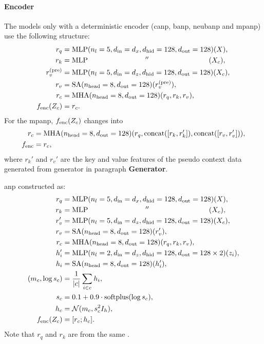 \paragraph{Encoder}
The models only with a deterministic encoder (\gls{canp}, \gls{banp}, \gls{neubanp} and \gls{mpanp}) use the following structure:
\begin{align*}
    r_q &= \text{MLP}(n_l=5, d_{\text{in}}=d_x, d_{\text{hid}}=128, d_{\text{out}}=128)(X), \\
    r_k &= \text{MLP} \qquad \qquad \qquad \qquad '' \qquad \qquad \qquad  \qquad \ (X_c), \\
    r_v^{(\text{pre})} &= \text{MLP}(n_l=5, d_{\text{in}}=d_z, d_{\text{hid}}=128, d_{\text{out}}=128)(X_c), \\
    r_v &= \text{SA}(n_{\text{head}}=8, d_{\text{out}}=128)(r_v^{(\text{pre})}), \\
    r_c &= \text{MHA}(n_{\text{head}}=8, d_{\text{out}}=128)(r_q, r_k, r_v), \\
    f_\text{enc}(Z_c) &= r_c.
\end{align*}
For the \gls{mpanp}, $f_{\text{enc}}(Z_c)$ changes into 
\begin{align*}
    r_c &= \text{MHA}(n_{\text{head}}=8, d_{\text{out}}=128)(r_q, \text{concat}([r_k,r_k']), \text{concat}([r_v,r_v'])),\\
    f_{\text{enc}} &= r_c,
\end{align*} where $r_k'$ and $r_v'$ are the key and value features of the pseudo context data generated from generator in paragraph \textbf{Generator}.

\gls{anp} constructed as:
\begin{align*}
    r_q &= \text{MLP}(n_l=5, d_{\text{in}}=d_x, d_{\text{hid}}=128, d_{\text{out}}=128)(X), \\
    r_k &= \text{MLP} \qquad \qquad \qquad \qquad '' \qquad \qquad \qquad  \qquad \ (X_c), \\
    r_v' &= \text{MLP}(n_l=5, d_{\text{in}}=d_z, d_{\text{hid}}=128, d_{\text{out}}=128)(X_c), \\
    r_v &= \text{SA}(n_{\text{head}}=8, d_{\text{out}}=128)(r_v'), \\
    r_c &= \text{MHA}(n_{\text{head}}=8, d_{\text{out}}=128)(r_q, r_k, r_v), \\
    h_i' &= \text{MLP}(n_l=2, d_{\text{in}}=d_z, d_{\text{hid}}=128, d_{\text{out}}=128 \times 2)(z_i), \\
    h_i &= \text{SA}(n_{\text{head}}=8, d_{\text{out}}=128)(h_i'), \\
    (m_c, \log s_c) &= \frac{1}{|c|} \sum_{i \in c} h_i, \\
    s_c &= 0.1 + 0.9 \cdot \text{softplus}(\log s_c), \\
    h_c &= {\mathcal{N}}(m_c, s^2_c I_h), \\
    f_\text{enc}(Z_c) &= [r_c; h_c].
\end{align*}
Note that $r_q$ and $r_k$ are from the same \MLP. 

